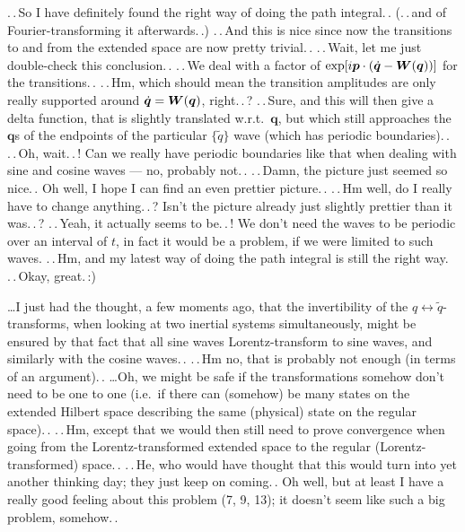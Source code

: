\documentclass{report}
\newcommand{\bsacc}[3]{#1{\boldsymbol{#2}\hspace{#3em}}\hspace{-#3em}}
\newcommand{\dotbsq}{{\bsacc{\dot}{q}{.15}}}
\begin{document}
.\,.\,So I have definitely found the right way of doing the path integral.\,. (.\,.\,and of Fourier-transforming it afterwards.\,.) .\,.\,And this is nice since now the transitions to and from the extended space are now pretty trivial.\,. .\,.\,Wait, let me just double-check this conclusion.\,. .\,.\,We deal with a factor of $\exp[i \boldsymbol{p} \cdot (\dotbsq - \boldsymbol{W}(\boldsymbol{q}))]$ for the transitions.\,. .\,.\,Hm, which should mean the transition amplitudes are only really supported around $\dotbsq = \boldsymbol{W}(\boldsymbol{q})$, right.\,.\,? .\,.\,Sure, and this will then give a delta function, that is slightly translated w.r.t.\ $\boldsymbol{q}$, but which still approaches the $\boldsymbol{q}$s of the endpoints of the particular $\{\tilde q\}$ wave (which has periodic boundaries).\,. .\,.\,Oh, wait.\,.\,! Can we really have periodic boundaries like that when dealing with sine and cosine waves --- no, probably not.\,. .\,.\,Damn, the picture just seemed so nice.\,. Oh well, I hope I can find an even prettier picture.\,. .\,.\,Hm well, do I really have to change anything.\,.\,? Isn't the picture already just slightly prettier than it was.\,.\,? .\,.\,Yeah, it actually seems to be.\,.\,! We don't need the waves to be periodic over an interval of $t$, in fact it would be a problem, if we were limited to such waves. .\,.\,Hm, and my latest way of doing the path integral is still the right way. .\,.\,Okay, great.\,:) %

\ldots I just had the thought, a few moments ago, that the invertibility of the $q\leftrightarrow\tilde q$-transforms, when looking at two inertial systems simultaneously, might be ensured by that fact that all sine waves Lorentz-transform to sine waves, and similarly with the cosine waves.\,. %
.\,.\,Hm no, that is probably not enough (in terms of an argument).\,. 
\ldots Oh, we might be safe if the transformations somehow don't need to be one to one (i.e.\ if there can (somehow) be many states on the extended Hilbert space describing the same (physical) state on the regular space).\,. .\,.\,Hm, except that we would then still need to prove convergence when going from the Lorentz-transformed extended space to the regular (Lorentz-transformed) space.\,. .\,.\,He, who would have thought that this would turn into yet another thinking day; they just keep on coming.\,. Oh well, but at least I have a really good feeling about this problem (7, 9, 13); it doesn't seem like such a big problem, somehow.\,. %
\end{document}
